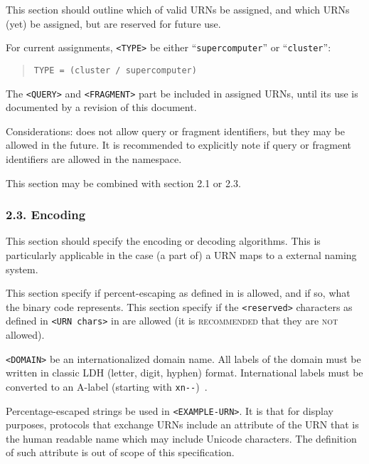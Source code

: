 \documentclass[12pt]{article}  %
\begin{document}
This section should outline which of valid URNs \MAY{} be assigned, and which URNs 
\MUSTNOT{} (yet) be assigned, but are reserved for future use.

\begin{example}
For current assignments, \texttt{<TYPE>} \MUST{} be either “\texttt{supercomputer}” or “\texttt{cluster}”:

\begin{quote}
  \texttt{TYPE = (\qq{}cluster\qq{} / \qq{}supercomputer\qq{})}
\end{quote}

The \texttt{<QUERY>} and \texttt{<FRAGMENT>} part \MUSTNOT{} be included in
assigned URNs, until its use is documented by a revision of this document.
\end{example}

Considerations: \cite{rfc2141} does not allow query or fragment identifiers,
but they may be allowed in the future. It is recommended to explicitly
note if query or fragment identifiers are allowed in the namespace.

This section may be combined with section 2.1 or 2.3.

\subsubsection*{2.3. Encoding}

This section should specify the encoding or decoding algorithms. 
This is particularly applicable in the case (a part of) a URN maps to a 
external naming system.

This section \MUST{} specify if percent-escaping as defined in \cite{rfc2141}
is allowed, and if so, what the binary code represents. This section \MUST{}
specify if the \texttt{<reserved>} characters as defined in \texttt{<URN
chars>} in \cite{rfc2141} are allowed (it is \textsc{recommended} that they are \textsc{not} allowed).

\begin{example}
\texttt{<DOMAIN>} \MAY{} be an internationalized domain name. All labels 
of the domain must be written in classic LDH (letter, digit, hyphen) format.
International labels must be converted to an A-label (starting with 
\texttt{xn-{}-})~\cite{rfc5890}.

Percentage-escaped strings \MUSTNOT{} be used in \texttt{<EXAMPLE-URN>}. 
It is \RECOMMENDED{} that for display purposes, protocols that exchange 
URNs include an attribute of the URN that is the human readable name 
which may include Unicode characters. The definition of such attribute 
is out of scope of this specification.
\end{example}
\end{document}
